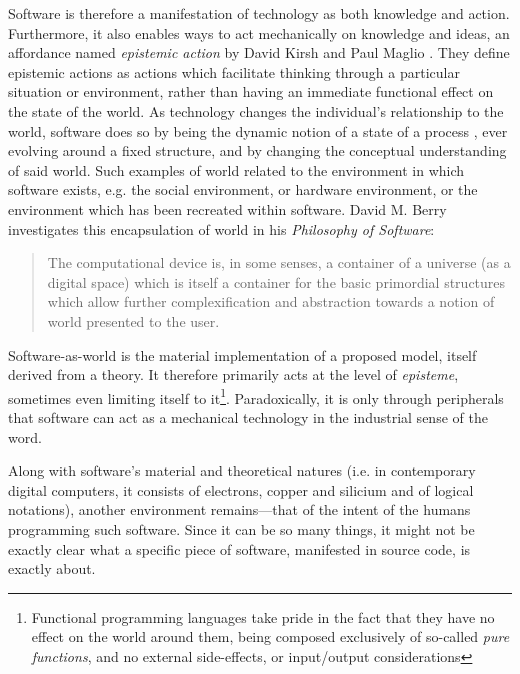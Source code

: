 Software is therefore a manifestation of technology as both knowledge and action. Furthermore, it also enables ways to act mechanically on knowledge and ideas, an affordance named \emph{epistemic action} by David Kirsh and Paul Maglio \citep{kirsh_distinguishing_1994}. They define epistemic actions as actions which facilitate thinking through a particular situation or environment, rather than having an immediate functional effect on the state of the world. As technology changes the individual's relationship to the world, software does so by being the dynamic notion of a state of a process \citep{rapaport_philosophy_2005}, ever evolving around a fixed structure, and by changing the conceptual understanding of said world. Such examples of world related to the environment in which software exists, e.g. the social environment, or hardware environment, or the environment which has been recreated within software. David M. Berry investigates this encapsulation of world in his \emph{Philosophy of Software}:

\begin{quote}
    The computational device is, in some senses, a container of a universe (as a digital space) which is itself a container for the basic primordial structures which allow further complexification and abstraction towards a notion of world presented to the user. \citep{berry_philosophy_2011}
\end{quote}

Software-as-world is the material implementation of a proposed model, itself derived from a theory. It therefore primarily acts at the level of \emph{episteme}, sometimes even limiting itself to it\footnote{Functional programming languages take pride in the fact that they have no effect on the world around them, being composed exclusively of so-called \emph{pure functions}, and no external side-effects, or input/output considerations}. Paradoxically, it is only through peripherals that software can act as a mechanical technology in the industrial sense of the word.

Along with software's material and theoretical natures (i.e. in contemporary digital computers, it consists of electrons, copper and silicium and of logical notations), another environment remains—that of the intent of the humans programming such software. Since it can be so many things, it might not be exactly clear what a specific piece of software, manifested in source code, is exactly about.

